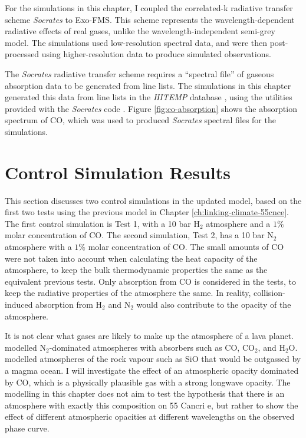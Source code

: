 For the simulations in this chapter, I coupled the correlated-k radiative transfer scheme \textit{Socrates} \citep{edwards1996socrates} to Exo-FMS. This scheme represents the wavelength-dependent radiative effects of real gases, unlike the wavelength-independent semi-grey model. The simulations used low-resolution spectral data, and were then post-processed using higher-resolution data to produce simulated observations.

The \textit{Socrates} radiative transfer scheme requires a ``spectral file'' of gaseous absorption data to be generated from line lists. The simulations in this chapter generated this data from line lists in the \textit{HITEMP} database \citep{rothman2010hitemp}, using the utilities provided with the \textit{Socrates} code \citep{edwards1996socrates}. Figure \ref{fig:co-absorption} shows the absorption spectrum of CO, which was used to produced \textit{Socrates} spectral files for the simulations.


\section{Control Simulation Results}\label{sec:control-simulations}

This section discusses two control simulations in the updated model, based on the first two tests using the previous model in Chapter \ref{ch:linking-climate-55cnce}. The first control simulation is Test 1, with a 10 bar H$_{2}$ atmosphere and a $1\%$ molar concentration of CO. The second simulation, Test 2, has a 10 bar N$_{2}$ atmosphere with a $1\%$ molar concentration of CO. The small amounts of CO were not taken into account when calculating the heat capacity of the atmosphere, to keep the bulk thermodynamic properties the same as the equivalent previous tests. Only absorption from CO is considered in the tests, to keep the radiative properties of the atmosphere the same. In reality, collision-induced absorption from H$_{2}$ and N$_{2}$ would also contribute to the opacity of the atmosphere.


 It is not clear what gases are likely to make up the atmosphere of a lava planet. \citet{miguel2018observability} modelled N$_{2}$-dominated atmospheres with absorbers such as CO, CO$_{2}$, and H$_{2}$O. \citet{ito2015theoretical} modelled atmospheres of the rock vapour such as SiO that would be outgassed by a magma ocean. I will investigate the effect of an atmospheric opacity dominated by CO, which is a physically plausible gas with a strong longwave opacity. The modelling in this chapter does not aim to test the hypothesis that there is an atmosphere with exactly this composition on 55 Cancri e, but rather to show the effect of different atmospheric opacities at different wavelengths on the observed phase curve.

